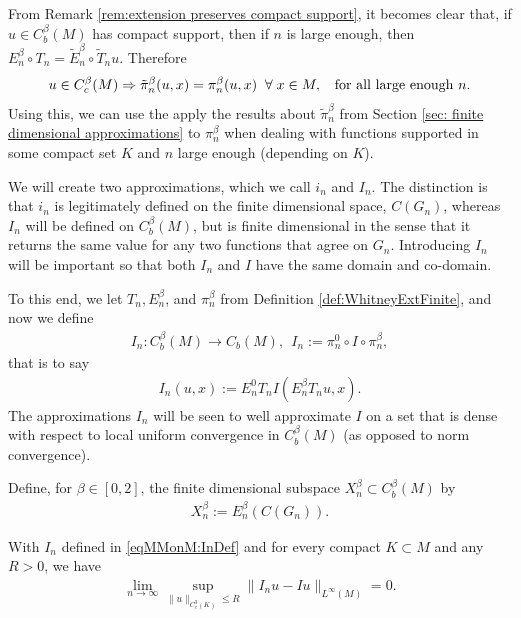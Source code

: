 \documentclass[11pt,reqno]{amsart}
\numberwithin{equation}{section}
\theoremstyle{plain}
\begin{document}
From Remark \ref{rem:extension preserves compact support}, it becomes clear that, if $u \in C^\beta_b(M)$ has compact support, then if $n$ is large enough, then $E_n^\beta \circ T_n = \tilde E_n^\beta \circ \tilde T_n u$. Therefore
\begin{align}\label{eqMMonM:ProjectionsAgree CompactlySupported Functions}
  u\in C^\beta_c(M) \Rightarrow \tilde \pi_n^\beta(u,x) = \pi_n^\beta(u,x)\;\;\forall\;x\in M,\;\;\textnormal{ for all large enough } n.
\end{align}
Using this, we can use the apply the results about $\tilde \pi_n^\beta$ from Section \ref{sec: finite dimensional approximations} to $\pi_n^\beta$ when dealing with functions supported in some compact set $K$ and $n$ large enough (depending on $K$).

We will create two approximations, which we call $i_n$ and $I_n$.  The distinction is that $i_n$ is legitimately defined on the finite dimensional space, $C(G_n)$, whereas $I_n$ will be defined on $C^\beta_b(M)$, but is finite dimensional in the sense that it returns the same value for any two functions that agree on $G_n$.  Introducing $I_n$ will be important so that both $I_n$ and $I$ have the same domain and co-domain. 

To this end, we let $T_n, E_n^\beta$, and $\pi_n^\beta$ from Definition \ref{def:WhitneyExtFinite}, and now we define
\begin{align*}
  I_n:C_b^{\beta}(M)\to C_b(M),\ \    I_n := \pi_n^{0} \circ I \circ \pi_n^{\beta}, 
\end{align*}
that is to say 
\begin{align}\label{eqMMonM:InDef}
  I_n(u,x) := E_n^{0}T_n I(E^{\beta}_nT_nu,x) .
\end{align}
The approximations $I_n$ will be seen to well approximate $I$ on a set that is dense with respect to local uniform convergence in $C^{\beta}_b(M)$ (as opposed to norm convergence).

\begin{DEF}\label{def:PiNandXbeta} 
  Define, for $\beta\in[0,2]$, the finite dimensional subspace $X^\beta_n\subset C^\beta_b(M)$ by
  \begin{align*}
    X_n^\beta := E_n^{\beta}(C(G_n)).	
  \end{align*}
\end{DEF}


\begin{prop}[Convergence of $I_n$ on $C^3_c(M)$]\label{prop:InConvergesUniformlyToI}
  With $I_n$ defined in \eqref{eqMMonM:InDef} and for every compact $K\subset M$ and any $R>0$, we have
  \begin{align*}
    \lim\limits_{n\to\infty}\sup \limits_{\|u\|_{C^{3}_c(K)}\leq R} \|I_nu- Iu\|_{L^\infty(M)} = 0.
  \end{align*}	  	
\end{prop}
	
\end{document}
